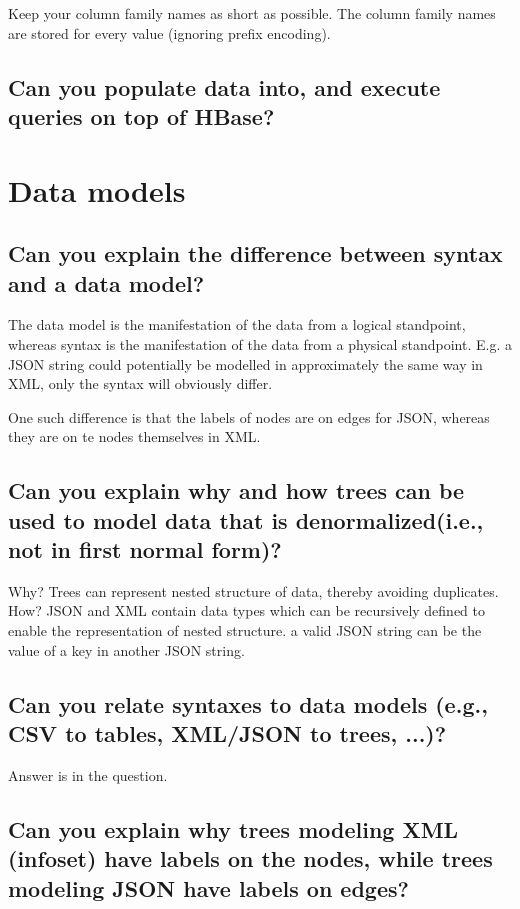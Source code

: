 \documentclass{article}
\begin{document}
Keep your column family names as short as possible. The column family names are stored for every value (ignoring prefix encoding). 

\subsection{Can you populate data into, and execute queries on top of HBase?}



\section{Data models}
\subsection{Can you explain the difference between syntax and a data model?}

The data model is the manifestation of the data from a logical standpoint, whereas syntax is the manifestation of the data from a physical standpoint. E.g. a JSON string could potentially be modelled in approximately the same way in XML, only the syntax will obviously differ.

One such difference is that the labels of nodes are on edges for JSON, whereas they are on te nodes themselves in XML.

\subsection{Can you explain why and how trees can be used to model data that is denormalized(i.e., not in first normal form)?}

Why? Trees can represent nested structure of data, thereby avoiding duplicates. How? JSON and XML contain data types which can be recursively defined to enable the representation of nested structure. a valid JSON string can be the value of a key in another JSON string.

\subsection{Can you relate syntaxes to data models (e.g., CSV to tables, XML/JSON to trees, ...)?}

Answer is in the question.

\subsection{Can you explain why trees modeling XML (infoset) have labels on the nodes, while trees modeling JSON have labels on edges?}
\end{document}

